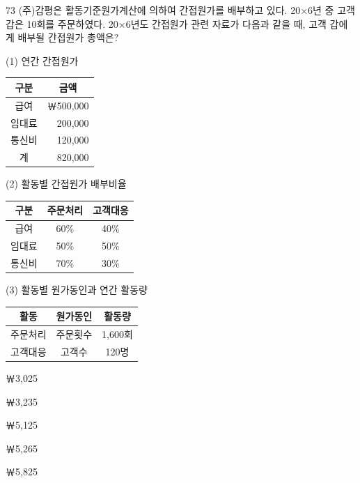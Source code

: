 \begin{question}{73}
(주)감평은 활동기준원가계산에 의하여 간접원가를 배부하고 있다. 20×6년 중 고객 갑은 10회를 주문하였다. 20×6년도 간접원가 관련 자료가 다음과 같을 때, 고객 갑에게 배부될 간접원가 총액은?

(1) 연간 간접원가 \par

{\small\centering
\begin{tabular}{|c|r|}\hline
구분 & \multicolumn{1}{c|}{금액} \\ \hline
급여 & ￦500,000 \\ \hline
임대료 & 200,000 \\ \hline
통신비 & 120,000 \\ \hline
계 & 820,000 \\ \hline
\end{tabular}\par}

(2) 활동별 간접원가 배부비율 \par

{\small\centering
\begin{tabular}{|c|c|c|}\hline
구분 & 주문처리 & 고객대응 \\ \hline
급여 & 60\% & 40\% \\ \hline
임대료 & 50\% & 50\% \\ \hline
통신비 & 70\% & 30\% \\ \hline
\end{tabular}\par}

(3) 활동별 원가동인과 연간 활동량 \par

{\small\centering
\begin{tabular}{|c|c|c|}\hline
활동 & 원가동인 & 활동량 \\ \hline
주문처리 & 주문횟수 & 1,600회 \\ \hline
고객대응 & 고객수 & 120명 \\ \hline
\end{tabular}\par}
\begin{choices}
  \item ￦3,025
  \item ￦3,235
  \item ￦5,125
  \item ￦5,265
  \item ￦5,825
\end{choices}
\end{question}
